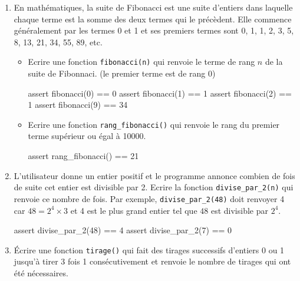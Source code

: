 \begin{exercice_cours}{}
\begin{enumerate}
				 \item En mathématiques, la suite de Fibonacci est une suite d'entiers dans laquelle chaque terme est la somme des deux termes qui le précèdent. Elle commence généralement par les termes 0 et 1 et ses premiers termes sont 0, 1, 1, 2, 3, 5, 8, 13, 21, 34, 55, 89, etc.
			
			\begin{itemize}
				\item Ecrire une fonction \verb|fibonacci(n)| qui renvoie le terme de rang $n$ de la suite de Fibonnaci. (le premier terme est de rang 0)
				\begin{CodePythontexAlt}[TaillePolice=\normalsize, Largeur=1\linewidth,Centre,PremLigne=1, Lignes=false,]{}
					assert fibonacci(0) == 0
					assert fibonacci(1) == 1
					assert fibonacci(2) == 1
					assert fibonacci(9) == 34
					\end{CodePythontexAlt}
				\item 			Ecrire une fonction \verb|rang_fibonacci()| qui renvoie le rang du premier terme supérieur ou égal à 10000.
				
			\begin{CodePythontexAlt}[Largeur=1\linewidth,Centre,PremLigne=1, Lignes=false,]{}
					assert rang_fibonacci() == 21
					\end{CodePythontexAlt}
			\end{itemize}

\medskip

			\item L'utilisateur donne un entier positif et le programme annonce combien de fois de suite cet entier est divisible par 2. Ecrire la fonction \verb|divise_par_2(n)| qui renvoie ce nombre de fois. Par exemple, \verb|divise_par_2(48)| doit renvoyer 4 car $48=2^4\times3$ et 4 est le plus grand entier tel que $48$ est divisible par $2^4$.
			
			\begin{CodePythontexAlt}[TaillePolice=\normalsize, Largeur=1\linewidth,Centre,PremLigne=1, Lignes=false,]{}
assert divise_par_2(48) == 4
assert divise_par_2(7) == 0
\end{CodePythontexAlt}

\medskip

	\item Écrire une fonction \verb|tirage()| qui fait des tirages successifs  d'entiers 0 ou 1 jusqu'à tirer 3 fois 1 consécutivement et
			renvoie le nombre de tirages qui ont été nécessaires.




			\end{enumerate}
	\end{exercice_cours}